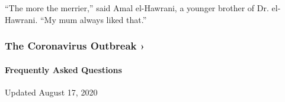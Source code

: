 ``The more the merrier,'' said Amal el-Hawrani, a younger brother of Dr.
el-Hawrani. ``My mum always liked that.''

\href{https://www.nytimes3xbfgragh.onion/news-event/coronavirus?action=click\&pgtype=Article\&state=default\&region=MAIN_CONTENT_3\&context=storylines_faq}{}

\hypertarget{the-coronavirus-outbreak-}{%
\subsubsection{The Coronavirus Outbreak
›}\label{the-coronavirus-outbreak-}}

\hypertarget{frequently-asked-questions}{%
\paragraph{Frequently Asked
Questions}\label{frequently-asked-questions}}

Updated August 17, 2020

